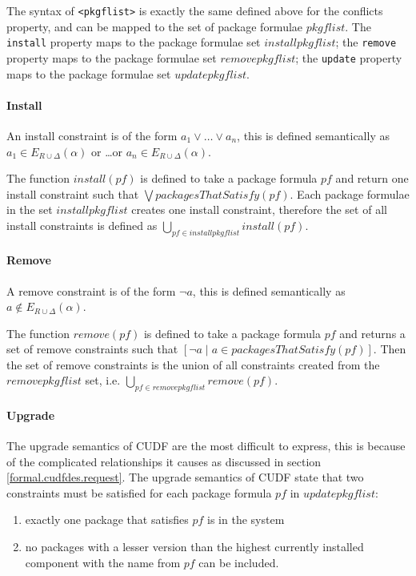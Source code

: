 The syntax of \verb+<pkgflist>+ is exactly the same defined above for the conflicts property, and can be mapped to the set of package formulae $pkgflist$.
The \verb+install+ property maps to the package formulae set $installpkgflist$; the \verb+remove+ property maps to the package formulae set $removepkgflist$;
the \verb+update+ property maps to the package formulae set  $updatepkgflist$.

\paragraph{Install}
An install constraint is of the form $a_1 \vee \ldots \vee a_n$,
this is defined semantically as $a_1 \in E_{R \cup \Delta}(\alpha)$ or \ldots or $a_n \in E_{R \cup \Delta}(\alpha)$.

The function  $install(pf)$ is defined to take a package formula $pf$ and return one install constraint such that $\bigvee packagesThatSatisfy(pf)$.
Each package formulae in the set $installpkgflist$ creates one install constraint,
therefore the set of all install constraints is defined as $\bigcup \limits_{pf \in installpkgflist} install(pf)$.

\paragraph{Remove}
A remove constraint is of the form $\neg a$,
this is defined semantically as $a \not \in E_{R \cup \Delta}(\alpha)$.

The function $remove(pf)$ is defined to take a package formula $pf$ and returns a set of remove constraints such that $[\neg a \mid  a \in packagesThatSatisfy(pf)]$.
Then the set of remove constraints is the union of all constraints created from the $removepkgflist$ set, i.e. $\bigcup \limits_{pf \in removepkgflist} remove(pf)$.

\paragraph{Upgrade}
The upgrade semantics of CUDF are the most difficult to express, this is because of the complicated relationships it causes as discussed in section \ref{formal.cudfdes.request}.
The upgrade semantics of CUDF state that two constraints must be satisfied for each package formula $pf$ in $updatepkgflist$:
\begin{enumerate}
  \item exactly one package that satisfies $pf$ is in the system
  \item no packages with a lesser version than the highest currently installed component with the name from $pf$ can be included.
\end{enumerate} 

